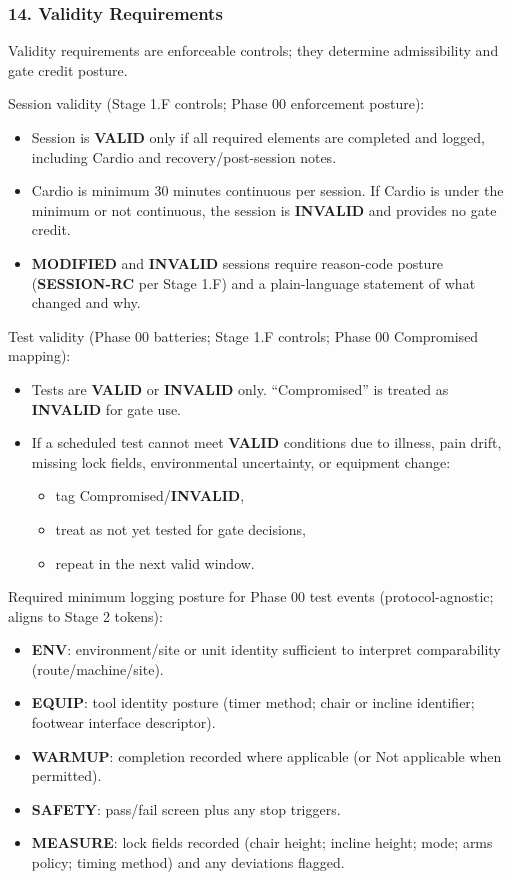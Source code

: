 \documentclass[10pt]{article}
\begin{document}
\subsubsection*{14. Validity Requirements}

Validity requirements are enforceable controls; they determine admissibility and gate credit posture.

Session validity (Stage 1.F controls; Phase 00 enforcement posture):

\begin{itemize}
\item Session is \textbf{VALID} only if all required elements are completed and logged, including Cardio and recovery/post-session notes.
\item Cardio is minimum 30 minutes continuous per session. If Cardio is under the minimum or not continuous, the session is \textbf{INVALID} and provides no gate credit.
\item \textbf{MODIFIED} and \textbf{INVALID} sessions require reason-code posture (\textbf{SESSION-RC} per Stage 1.F) and a plain-language statement of what changed and why.
\end{itemize}

Test validity (Phase 00 batteries; Stage 1.F controls; Phase 00 Compromised mapping):

\begin{itemize}
\item Tests are \textbf{VALID} or \textbf{INVALID} only. “Compromised” is treated as \textbf{INVALID} for gate use.
\item If a scheduled test cannot meet \textbf{VALID} conditions due to illness, pain drift, missing lock fields, environmental uncertainty, or equipment change:
  \begin{itemize}
  \item tag Compromised/\textbf{INVALID},
  \item treat as not yet tested for gate decisions,
  \item repeat in the next valid window.
  \end{itemize}
\end{itemize}

Required minimum logging posture for Phase 00 test events (protocol-agnostic; aligns to Stage 2 tokens):

\begin{itemize}
\item \textbf{ENV}: environment/site or unit identity sufficient to interpret comparability (route/machine/site).
\item \textbf{EQUIP}: tool identity posture (timer method; chair or incline identifier; footwear interface descriptor).
\item \textbf{WARMUP}: completion recorded where applicable (or Not applicable when permitted).
\item \textbf{SAFETY}: pass/fail screen plus any stop triggers.
\item \textbf{MEASURE}: lock fields recorded (chair height; incline height; mode; arms policy; timing method) and any deviations flagged.
\end{itemize}
\end{document}
